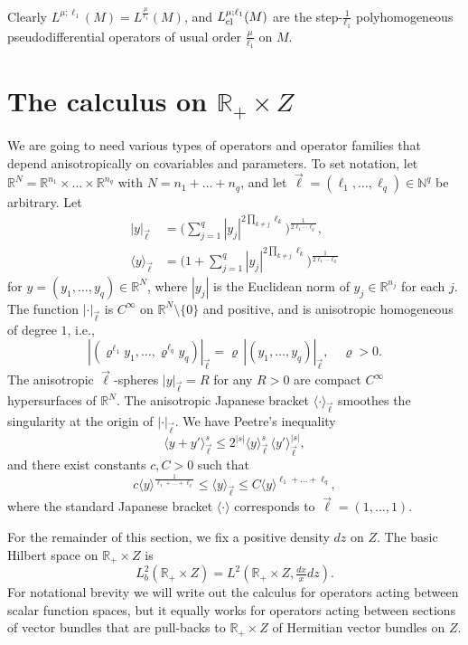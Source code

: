 \documentclass[reqno]{amsart}
\numberwithin{equation}{section}
\theoremstyle{definition}
\def\N{\mathbb N}
\def\R{\mathbb R}
\begin{document}
Clearly $L^{\mu;\ell_1}(M) = L^{\frac{\mu}{\ell_1}}(M)$, and $L^{\mu;\ell_1}_{\textup{cl}}(M)$ are the step-$\frac{1}{\ell_1}$ polyhomogeneous pseudodifferential operators of usual order $\frac{\mu}{\ell_1}$ on $M$.


\section{The calculus on $\R_+\times Z$}\label{PseudoCalculusExit}

\noindent
We are going to need various types of operators and operator families that depend anisotropically on covariables and parameters. To set notation, let $\R^{N} = \R^{n_1} \times \ldots \times \R^{n_q}$ with $N = n_1 + \ldots +n_q$, and let $\vec{\ell} = (\ell_1,\ldots,\ell_q) \in \N^q$ be arbitrary. Let
\begin{align*}
|y|_{\vec{\ell}} &= \biggl(\sum\limits_{j=1}^q |y_j|^{2\prod_{k \neq j}\ell_k}\biggr)^{\frac{1}{2\ell_1\cdots\ell_q}}, \\
\langle y \rangle_{\vec{\ell}} &= \biggl(1 + \sum\limits_{j=1}^q |y_j|^{2\prod_{k \neq j}\ell_k}\biggr)^{\frac{1}{2\ell_1\cdots\ell_q}}
\end{align*}
for $y = (y_1,\ldots,y_q) \in \R^N$, where $|y_j|$ is the Euclidean norm of $y_j \in \R^{n_j}$ for each $j$. The function $|\cdot|_{\vec{\ell}}$ is $C^{\infty}$ on $\R^N\setminus \{0\}$ and positive, and is anisotropic homogeneous of degree $1$, i.e.,
$$
|(\varrho^{\ell_1}y_1,\ldots,\varrho^{\ell_q}y_q)|_{\vec{\ell}} = \varrho \, |(y_1,\ldots,y_q)|_{\vec{\ell}}, \quad \varrho > 0.
$$
The anisotropic $\vec{\ell}$-spheres $|y|_{\vec{\ell}} = R$ for any $R > 0$ are compact $C^{\infty}$ hypersurfaces of $\R^N$. The anisotropic Japanese bracket $\langle \cdot \rangle_{\vec{\ell}}$ smoothes the singularity at the origin of $|\cdot|_{\vec{\ell}}$. We have Peetre's inequality
$$
\langle y + y' \rangle_{\vec{\ell}}^s \leq 2^{|s|}\langle y \rangle_{\vec{\ell}}^s\,\langle y'\rangle_{\vec{\ell}}^{|s|},
$$
and there exist constants $c,C > 0$ such that
$$
c\langle y\rangle^{\frac{1}{\ell_1+\ldots+\ell_q}} \leq \langle y \rangle_{\vec{\ell}} \leq C \langle y \rangle^{\ell_1+\ldots+\ell_q},
$$
where the standard Japanese bracket $\langle \cdot \rangle$ corresponds to $\vec{\ell} = (1,\ldots,1)$.

\medskip

\noindent
For the remainder of this section, we fix a positive density $dz$ on $Z$. The basic Hilbert space on $\R_+\times Z$ is
$$
L^2_b(\R_+\times Z) = L^2(\R_+\times Z,\tfrac{dx}{x}dz).
$$
For notational brevity we will write out the calculus for operators acting between scalar function spaces, but it equally works for operators acting between sections of vector bundles that are pull-backs to $\R_+\times Z$ of Hermitian vector bundles on $Z$.
 
\end{document}
